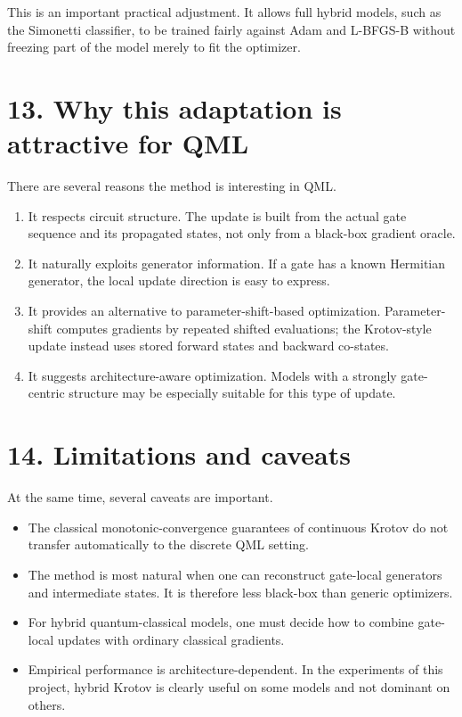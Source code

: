 \documentclass[11pt]{article}
\begin{document}
This is an important practical adjustment. It allows full hybrid models, such as the Simonetti classifier, to be trained fairly against Adam and L-BFGS-B without freezing part of the model merely to fit the optimizer.

\section*{13. Why this adaptation is attractive for QML}
There are several reasons the method is interesting in QML.
\begin{enumerate}
\item It respects circuit structure. The update is built from the actual gate sequence and its propagated states, not only from a black-box gradient oracle.
\item It naturally exploits generator information. If a gate has a known Hermitian generator, the local update direction is easy to express.
\item It provides an alternative to parameter-shift-based optimization. Parameter-shift computes gradients by repeated shifted evaluations; the Krotov-style update instead uses stored forward states and backward co-states.
\item It suggests architecture-aware optimization. Models with a strongly gate-centric structure may be especially suitable for this type of update.
\end{enumerate}

\section*{14. Limitations and caveats}
At the same time, several caveats are important.
\begin{itemize}
\item The classical monotonic-convergence guarantees of continuous Krotov do not transfer automatically to the discrete QML setting.
\item The method is most natural when one can reconstruct gate-local generators and intermediate states. It is therefore less black-box than generic optimizers.
\item For hybrid quantum-classical models, one must decide how to combine gate-local updates with ordinary classical gradients.
\item Empirical performance is architecture-dependent. In the experiments of this project, hybrid Krotov is clearly useful on some models and not dominant on others.
\end{itemize}
\end{document}
